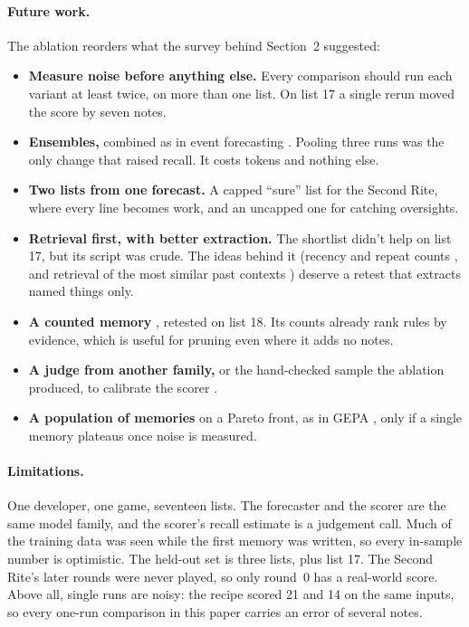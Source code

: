 \documentclass[10pt]{article}
\begin{document}
\paragraph{Future work.} The ablation reorders what the survey behind Section~2 suggested:
\begin{itemize}[leftmargin=*]
  \item \textbf{Measure noise before anything else.} Every comparison should run each variant at least twice, on more than one list. On list 17 a single rerun moved the score by seven notes.
  \item \textbf{Ensembles,} combined as in event forecasting \citep{halawi2024approaching}. Pooling three runs was the only change that raised recall. It costs tokens and nothing else.
  \item \textbf{Two lists from one forecast.} A capped ``sure'' list for the Second Rite, where every line becomes work, and an uncapped one for catching oversights.
  \item \textbf{Retrieval first, with better extraction.} The shortlist didn't help on list 17, but its script was crude. The ideas behind it (recency and repeat counts \citep{kim2007predicting, salemi2024lamp}, and retrieval of the most similar past contexts \citep{gao2024aligning, suzgun2026dynamic}) deserve a retest that extracts named things only.
  \item \textbf{A counted memory} \citep{zhang2026ace, zhao2024expel}, retested on list 18. Its counts already rank rules by evidence, which is useful for pruning even where it adds no notes.
  \item \textbf{A judge from another family,} or the hand-checked sample the ablation produced, to calibrate the scorer \citep{panickssery2024llm}.
  \item \textbf{A population of memories} on a Pareto front, as in GEPA \citep{agrawal2026gepa}, only if a single memory plateaus once noise is measured.
\end{itemize}

\paragraph{Limitations.} One developer, one game, seventeen lists. The forecaster and the scorer are the same model family, and the scorer's recall estimate is a judgement call. Much of the training data was seen while the first memory was written, so every in-sample number is optimistic. The held-out set is three lists, plus list 17. The Second Rite's later rounds were never played, so only round~0 has a real-world score. Above all, single runs are noisy: the recipe scored 21 and 14 on the same inputs, so every one-run comparison in this paper carries an error of several notes.
\end{document}

